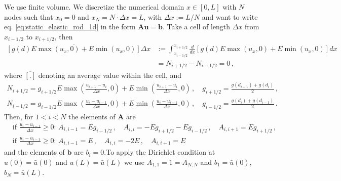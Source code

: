 \documentclass[11pt,a4paper]{article}
\newcommand{\tg}[1]{\textcolor{blue}{TG: #1} }
\begin{document}
We use finite volume. We discretize the numerical domain $x \in[0,L]$ with $N$ nodes such that $x_0 = 0$ and $x_N = N \cdot \Delta x = L$, with $\Delta x := L/N$ and want to write eq. \eqref{eq:static_elastic_rod_1d} in the form $\mathbf{A} \mathbf{u} = \mathbf{b}$. Take a cell of length $\Delta x$ from $x_{i-1/2}$ to $x_{i+1/2}$, then
\begin{align*}
    \overline{\left[ g(d) E \max(u_x,0) + E \min(u_x,0)\right]} \Delta x
    &:= 
    \int_{x_{i-1/2}}^{x_{i+1/2}} \frac{d}{dx} \left[ g(d) E \max(u_x,0) + E \min(u_x,0) \right] dx 
    \\
    &= N_{i+1/2} - N_{i-1/2} = 0
    \,,
\end{align*}
where $\overline{[.]}$ denoting an average value within the cell, and
\begin{align*}
    N_{i+1/2} = g_{i+1/2} E \max(\frac{u_{i+1} - u_i}{\Delta x},0) + E \min(\frac{u_{i+1} - u_i}{\Delta x},0)
    \,, \quad
    g_{i+1/2} = \frac{g(d_{i+1}) + g(d_i)}{2}
    \,,
    \\
    N_{i-1/2} = g_{i-1/2} E \max(\frac{u_{i} - u_{i-1}}{\Delta x},0) + E \min(\frac{u_{i} - u_{i-1}}{\Delta x},0)
    \,, \quad
    g_{i-1/2} = \frac{g(d_{i}) + g(d_{i-1})}{2}
    \,.
\end{align*}
Then, for $1<i<N$ the elements of $\mathbf{A}$ are
\begin{align*}
&\text{if } \frac{u_{i} - u_{i-1}}{\Delta x} \geq 0 \text{: } 
A_{i,i-1} = E g_{i-1/2}
\,,
\quad 
A_{i,i} = - E g_{i+1/2} - E g_{i-1/2}
\,, 
\quad 
A_{i,i+1} = E g_{i+1/2}
\,,
\\
&
\text{if } \frac{u_{i} - u_{i-1}}{\Delta x} \geq 0 \text{: } 
A_{i,i-1} = E 
\,,
\quad 
A_{i,i} = - 2 E 
\,, \quad
A_{i,i+1} = E 
\end{align*}
and the elements of $\mathbf{b}$ are $b_{i}=0$.To apply the Dirichlet condition at $u(0)=\bar{u}(0)$ and $u(L)=\bar{u}(L)$ we use $A_{1,1} = 1 = A_{N,N}$ and $b_1 = \bar{u}(0)$, $b_N = \bar{u}(L)$. 

\end{document}
